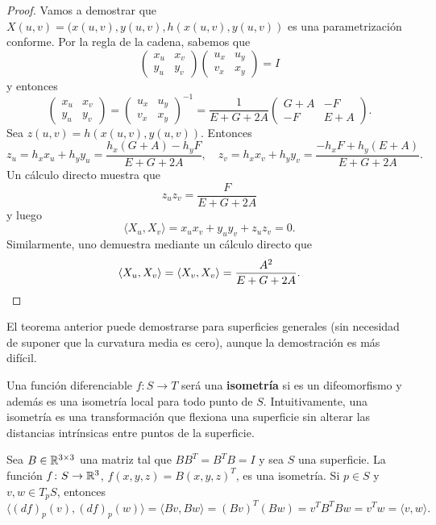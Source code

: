 \begin{proof}
	Vamos a demostrar que $X(u,v)=(x(u,v),y(u,v),h(x(u,v),y(u,v))$ es una
	parametrización conforme. Por la regla de la cadena, sabemos que
	\[
		\begin{pmatrix}
			x_u & x_v\\
			y_u & y_v
		\end{pmatrix}
		\begin{pmatrix}
			u_x & u_y\\
			v_x & x_y
		\end{pmatrix}
		=I
	\]
	y entonces
	\[
		\begin{pmatrix}
			x_u & x_v\\
			y_u & y_v
		\end{pmatrix}
		=\begin{pmatrix}
			u_x & u_y\\
			v_x & x_y
		\end{pmatrix}^{-1}
		=\frac{1}{E+G+2A}\begin{pmatrix}
			G+A & -F\\
			-F & E+A
		\end{pmatrix}.
	\]
	Sea $z(u,v)=h(x(u,v),y(u,v))$. Entonces
	\[
		z_u=h_xx_u+h_yy_u=\frac{h_x(G+A)-h_yF}{E+G+2A},\quad
		z_v=h_xx_v+h_yy_v=\frac{-h_xF+h_y(E+A)}{E+G+2A}.
	\]
	Un cálculo directo muestra que
	\[
		z_uz_v=\frac{F}{E+G+2A}
	\]
	y luego 
	\[
		\langle X_u,X_v\rangle=x_ux_v+y_uy_v+z_uz_v=0.
	\]
	Similarmente, uno demuestra mediante un cálculo directo que 
	\[
		\langle X_u,X_v\rangle=\langle X_v,X_v\rangle=\frac{A^2}{E+G+2A}.\qedhere
	\]
\end{proof}

El teorema anterior puede demostrarse para superficies generales (sin necesidad
de suponer que la curvatura media es cero), aunque la demostración es más
difícil.

Una función diferenciable $f\colon S\to T$ será una \textbf{isometría} si es un
difeomorfismo y además es una isometría local para todo punto de $S$.
Intuitivamente, una isometría es una transformación que flexiona una superficie
sin alterar las distancias intrínsicas entre puntos de la superficie. 

\begin{example}
	Sea $B\in\mathbb{R}^{3\times 3}$ una matriz tal que $BB^T=B^TB=I$ y sea $S$ una
	superficie. La función $f\colon S\to\mathbb{R}^3$, $f(x,y,z)=B(x,y,z)^T$, es una
	isometría. Si $p\in S$ y $v,w\in T_pS$, entonces
	\[
		\langle (df)_p(v),(df)_p(w)\rangle=\langle Bv,Bw\rangle=(Bv)^T(Bw)=v^TB^TBw=v^Tw=\langle v,w\rangle.
	\]
\end{example}

